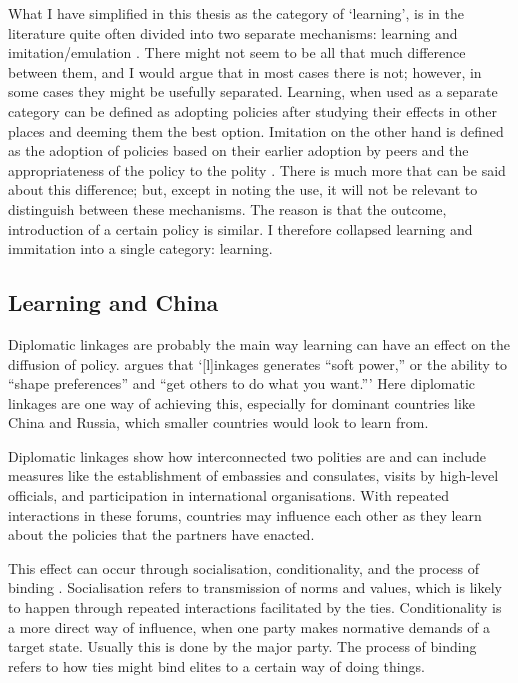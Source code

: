 What I have simplified in this thesis as the category of `learning', is in the literature quite often divided into two separate mechanisms: learning and imitation/emulation \citep{ elkins_waves_2005, gilardi_four_2016, shipan_mechanisms_2008}. There might not seem to be all that much difference between them, and I would argue that in most cases there is not; however, in some cases they might be usefully separated. Learning, when used as a separate category can be defined as adopting policies after studying their effects in other places and deeming them the best option. Imitation on the other hand is defined as the adoption of policies based on their earlier adoption by peers and the appropriateness of the policy to the polity \citep[pp. 799-801]{simmons_introduction_2006}. There is much more that can be said about this difference; but, except in noting the use, it will not be relevant to distinguish between these mechanisms. The reason is that the outcome, introduction of a certain policy is similar. I therefore collapsed learning and immitation into a single category: learning. 

\subsection{Learning and China}

Diplomatic linkages are probably the main way learning can have an effect on the diffusion of policy. \citet[p. 385]{levitsky_linkage_2006} argues that `[l]inkages generates ``soft power,'' or the ability to ``shape preferences'' and ``get others to do what you want.''' Here diplomatic linkages are one way of achieving this, especially for dominant countries like China and Russia, which smaller countries would look to learn from.

Diplomatic linkages show how interconnected two polities are and can include measures like the establishment of embassies and consulates, visits by high-level officials, and participation in international organisations. With repeated interactions in these forums, countries may influence each other as they learn about the policies that the partners have enacted. 

This effect can occur through socialisation, conditionality, and the process of binding \citep[pp. 1323-1326]{ambrosio_catching_2008}. Socialisation refers to transmission of norms and values, which is likely to happen through repeated interactions facilitated by the ties. Conditionality is a more direct way of influence, when one party makes normative demands of a target state. Usually this is done by the major party. The process of binding refers to how ties might bind elites to a certain way of doing things.

